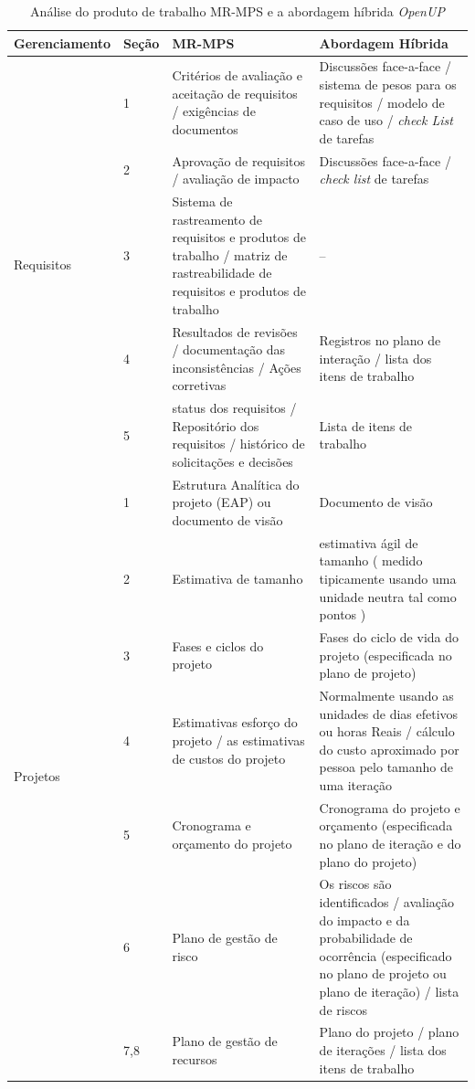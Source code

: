 \documentclass{acm_proc_article-sp}
\begin{document}
\begin{table}[h]
\scriptsize
\caption{Análise do produto de trabalho MR-MPS e a abordagem híbrida \textit{OpenUP} \cite{Arimoto:melhoria}} 
\centering
\begin{tabular}{|p{20mm}|p{10mm}|p{60mm}|p{60mm}|}
\hline
\textbf{Gerenciamento} & \textbf{Seção} & \textbf{MR-MPS} & \textbf{Abordagem Híbrida} \\
\hline
\multirow{5}{*}{Requisitos} & 1 & Critérios de avaliação e aceitação de requisitos / exigências de documentos & 
Discussões face-a-face / sistema de pesos para os requisitos / modelo de caso de uso / \textit{check List} de tarefas\\
& 2 & Aprovação de requisitos / avaliação de impacto & Discussões face-a-face / \textit{check list} de tarefas \\
& 3 & Sistema de rastreamento de requisitos e produtos de trabalho / matriz de rastreabilidade de requisitos e produtos de trabalho
& -- \\
& 4 & Resultados de revisões / documentação das inconsistências / Ações corretivas & Registros no plano de interação / lista dos itens de trabalho \\
& 5 & status dos requisitos / Repositório dos requisitos / histórico de solicitações e decisões & Lista de itens de trabalho \\
\hline
\multirow{14}{*}{Projetos} & 1 & Estrutura Analítica do projeto (EAP) ou documento de visão & Documento de visão \\
& 2 & Estimativa de tamanho &  estimativa ágil de tamanho ( medido tipicamente usando uma unidade neutra tal como pontos ) \\
& 3 & Fases e ciclos do projeto & Fases do ciclo de vida do projeto (especificada no plano de projeto) \\
& 4 & Estimativas esforço do projeto / as estimativas de custos do projeto & Normalmente usando as unidades de dias efetivos ou horas Reais / cálculo do custo aproximado por pessoa pelo tamanho de uma iteração \\
& 5 & Cronograma e orçamento do projeto & Cronograma do projeto e orçamento (especificada no plano de iteração e do plano do projeto) \\
& 6 & Plano de gestão de risco & Os riscos são identificados / avaliação do impacto e da probabilidade de ocorrência (especificado no plano de projeto ou plano de iteração) / lista de riscos \\
& 7,8 & Plano de gestão de recursos & Plano do projeto / plano de iterações / lista dos itens de trabalho \\

\end{tabular}
\end{table}
\end{document}
